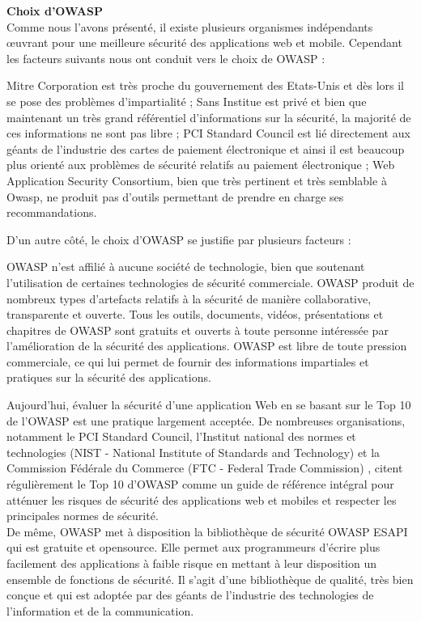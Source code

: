 \textbf{\RIGHTarrow Choix d'OWASP}\\
Comme nous l'avons présenté, il existe plusieurs organismes indépendants œuvrant pour une meilleure sécurité des applications web et mobile. Cependant les facteurs suivants nous ont conduit vers le choix de OWASP :
\begin{itemize}
	\itemtirait Mitre Corporation est très proche du gouvernement des Etats-Unis et dès lors il se pose des problèmes d'impartialité ;
	\itemtirait Sans Institue est privé et bien que maintenant un très grand référentiel d'informations sur la sécurité, la majorité de ces informations ne sont pas libre ;
	\itemtirait PCI Standard Council est lié directement aux géants de l'industrie des cartes de paiement électronique et ainsi il est beaucoup plus orienté aux problèmes de sécurité relatifs au paiement électronique ;
	\itemtirait Web Application Security Consortium, bien que très pertinent et très semblable à Owasp, ne produit pas d'outils permettant de prendre en charge ses recommandations.
\end{itemize}
D'un autre côté, le choix d'OWASP se justifie par plusieurs facteurs :
\begin{itemize}
	\itemcheck OWASP n'est affilié à aucune société de technologie, bien que soutenant l'utilisation de certaines technologies de sécurité commerciale. OWASP produit de nombreux types d'artefacts relatifs à la sécurité de manière collaborative, transparente et ouverte.
	\itemcheck Tous les outils, documents, vidéos, présentations et chapitres de OWASP sont gratuits et ouverts à toute personne intéressée par l'amélioration de la sécurité des applications.
	\itemcheck OWASP est libre de toute pression commerciale, ce qui lui permet de fournir des informations impartiales et pratiques sur la sécurité des applications.
\end{itemize}
\begin{comment}
	+ comparaison + tableau 
\end{comment}
Aujourd'hui, évaluer la sécurité d’une application Web en se basant sur le Top 10 de l’OWASP est une pratique largement acceptée. De nombreuses organisations, notamment le PCI Standard Council, l'Institut national des normes et technologies (NIST - National Institute of Standards and Technology)  et la Commission Fédérale du Commerce (FTC - Federal Trade Commission) , citent régulièrement le Top 10 d'OWASP comme un guide de référence intégral pour atténuer les risques de sécurité des applications web et mobiles et respecter les principales normes de sécurité.\\
De même, OWASP met à disposition la bibliothèque de sécurité OWASP ESAPI qui est gratuite et opensource. Elle permet aux programmeurs d'écrire plus facilement des applications à faible risque en mettant à leur disposition un ensemble de fonctions de sécurité. Il s'agit d'une bibliothèque de qualité, très bien conçue et qui est adoptée par des géants de l'industrie des technologies de l'information et de la communication.